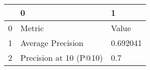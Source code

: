 \begin{tabular}{lll}
\toprule
{} &                       0 &         1 \\
\midrule
0 &                  Metric &     Value \\
1 &       Average Precision &  0.692041 \\
2 &  Precision at 10 (P@10) &       0.7 \\
\bottomrule
\end{tabular}
